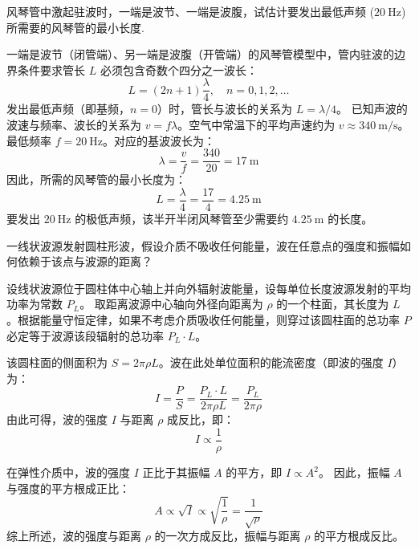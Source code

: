 \begin{exercise}\label{ex:8.12}
风琴管中激起驻波时，一端是波节、一端是波腹，试估计要发出最低声频 ($20 \ \mathrm{Hz}$) 所需要的风琴管的最小长度.
\end{exercise}
\begin{solution}
一端是波节（闭管端）、另一端是波腹（开管端）的风琴管模型中，管内驻波的边界条件要求管长 $L$ 必须包含奇数个四分之一波长：
$$ L = (2n + 1) \frac{\lambda}{4}, \quad n = 0, 1, 2, \ldots $$
发出最低声频（即基频，$n=0$）时，管长与波长的关系为 $L = \lambda / 4$。
已知声波的波速与频率、波长的关系为 $v = f \lambda$。空气中常温下的平均声速约为 $v \approx 340 \ \mathrm{m/s}$。
最低频率 $f = 20 \ \mathrm{Hz}$。对应的基波波长为：
$$ \lambda = \frac{v}{f} = \frac{340}{20} = 17 \ \mathrm{m} $$
因此，所需的风琴管的最小长度为：
$$ L = \frac{\lambda}{4} = \frac{17}{4} = 4.25 \ \mathrm{m} $$
要发出 $20 \ \mathrm{Hz}$ 的极低声频，该半开半闭风琴管至少需要约 $4.25 \ \mathrm{m}$ 的长度。
\end{solution}

\begin{exercise}\label{ex:8.13}
一线状波源发射圆柱形波，假设介质不吸收任何能量，波在任意点的强度和振幅如何依赖于该点与波源的距离？
\end{exercise}
\begin{solution}
设线状波源位于圆柱体中心轴上并向外辐射波能量，设每单位长度波源发射的平均功率为常数 $P_L$。
取距离波源中心轴向外径向距离为 $\rho$ 的一个柱面，其长度为 $L$。根据能量守恒定律，如果不考虑介质吸收任何能量，则穿过该圆柱面的总功率 $P$ 必定等于波源该段辐射的总功率 $P_L \cdot L$。

该圆柱面的侧面积为 $S = 2\pi \rho L$。波在此处单位面积的能流密度（即波的强度 $I$）为：
$$ I = \frac{P}{S} = \frac{P_L \cdot L}{2\pi \rho L} = \frac{P_L}{2\pi \rho} $$
由此可得，波的强度 $I$ 与距离 $\rho$ 成反比，即：
$$ I \propto \frac{1}{\rho} $$

在弹性介质中，波的强度 $I$ 正比于其振幅 $A$ 的平方，即 $I \propto A^2$。
因此，振幅 $A$ 与强度的平方根成正比：
$$ A \propto \sqrt{I} \propto \sqrt{\frac{1}{\rho}} = \frac{1}{\sqrt{\rho}} $$
综上所述，波的强度与距离 $\rho$ 的一次方成反比，振幅与距离 $\rho$ 的平方根成反比。
\end{solution}

